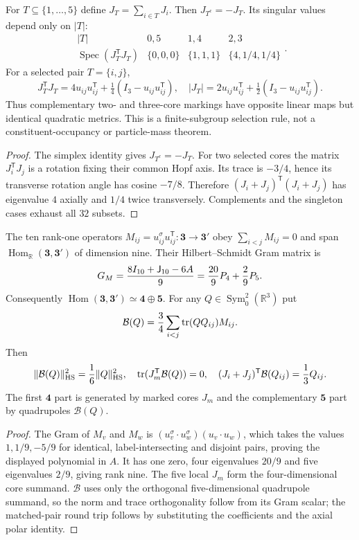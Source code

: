\documentclass[11pt]{article}
\begin{document}
\begin{theorem}
\label{p1:thm:petersen-subset-polar}
For $T\subseteq\{1,\dots,5\}$ define $J_T=\sum_{i\in T}J_i$.
Then $J_{T^c}=-J_T$. Its singular values depend only on $|T|$:
\[
 \begin{array}{c|ccc}
 |T|&0,5&1,4&2,3\\ \hline
 \operatorname{Spec}(J_T^{\mathsf T}J_T)
   &\{0,0,0\}&\{1,1,1\}&\{4,1/4,1/4\}
 \end{array}.
\]
For a selected pair $T=\{i,j\}$,
\[
 \boxed{J_T^{\mathsf T}J_T
 =4u_{ij}u_{ij}^{\mathsf T}
 +\tfrac14(I_3-u_{ij}u_{ij}^{\mathsf T}),}
 \quad |J_T|=2u_{ij}u_{ij}^{\mathsf T}
 +\tfrac12(I_3-u_{ij}u_{ij}^{\mathsf T}).
\]
Thus complementary two- and three-core markings have opposite linear
maps but identical quadratic metrics. This is a finite-subgroup
selection rule, not a constituent-occupancy or particle-mass theorem.
\end{theorem}
\begin{proof}
The simplex identity gives $J_{T^c}=-J_T$. For two selected
cores the matrix $J_i^{\mathsf T}J_j$ is a rotation fixing their
common Hopf axis. Its trace is $-3/4$, hence its transverse rotation
angle has cosine $-7/8$. Therefore $(J_i+J_j)^{\mathsf T}
(J_i+J_j)$ has eigenvalue $4$ axially and $1/4$ twice transversely.
Complements and the singleton cases exhaust all $32$ subsets.
\end{proof}

\begin{theorem}
\label{p1:thm:petersen-mirror-envelope}
The ten rank-one operators
$M_{ij}=u_{ij}^\sigma u_{ij}^{\mathsf T}:\mathbf3\to\mathbf3'$
obey $\sum_{i<j}M_{ij}=0$ and span
$\operatorname{Hom}_{\mathbb R}(\mathbf3,\mathbf3')$ of dimension nine.
Their Hilbert--Schmidt Gram matrix is
\[
 G_M={8I_{10}+\mathsf J_{10}-6A\over9}
       ={20\over9}P_4+{2\over9}P_5.
\]
Consequently
$\operatorname{Hom}(\mathbf3,\mathbf3')\simeq\mathbf4\oplus\mathbf5$.
For any $Q\in\operatorname{Sym}^2_0(\mathbb R^3)$ put
\[
 \mathcal B(Q)={3\over4}\sum_{i<j}
  \operatorname{tr}(QQ_{ij})M_{ij}.
\]
Then
\[
 \|\mathcal B(Q)\|_{\rm HS}^2={1\over6}\|Q\|_{\rm HS}^2,
 \quad\operatorname{tr}(J_m^{\mathsf T}\mathcal B(Q))=0,
 \quad(J_i+J_j)^{\mathsf T}\mathcal B(Q_{ij})={1\over3}Q_{ij}.
\]
The first $\mathbf4$ part is generated by marked cores $J_m$ and
the complementary $\mathbf5$ part by quadrupoles $\mathcal B(Q)$.
\end{theorem}
\begin{proof}
The Gram of $M_v$ and $M_w$ is
$(u_v^\sigma\cdot u_w^\sigma)(u_v\cdot u_w)$, which takes the
values $1,1/9,-5/9$ for identical, label-intersecting and disjoint
pairs, proving the displayed polynomial in $A$. It has one zero,
four eigenvalues $20/9$ and five eigenvalues $2/9$, giving rank nine.
The five local $J_m$ form the four-dimensional core summand.
$\mathcal B$ uses only the orthogonal five-dimensional quadrupole
summand, so the norm and trace orthogonality follow from its Gram
scalar; the matched-pair round trip follows by substituting the
coefficients and the axial polar identity.
\end{proof}
\end{document}
